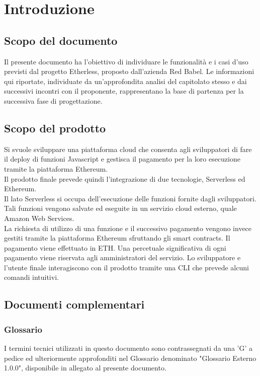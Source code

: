 \section{Introduzione}
\subsection{Scopo del documento}
	Il presente documento ha l'obiettivo di individuare le funzionalità e i casi d'uso previsti dal progetto Etherless, proposto dall'azienda Red Babel. Le informazioni qui riportate, individuate da un'approfondita analisi del capitolato stesso e dai successivi incontri con il proponente, rappresentano la base di partenza per la successiva fase di progettazione.

\subsection{Scopo del prodotto}
	Si svuole sviluppare una piattaforma cloud che consenta agli sviluppatori di fare il deploy di funzioni Javascript e gestisca il pagamento per la loro esecuzione tramite la piattaforma Ethereum.\\
	Il prodotto finale prevede quindi l'integrazione di due tecnologie, Serverless ed Ethereum.\\
	Il lato Serverless si occupa dell'esecuzione delle funzioni fornite dagli sviluppatori. Tali funzioni vengono salvate ed eseguite in un servizio cloud esterno, quale Amazon Web Services.  \\La richiesta di utilizzo di una funzione e il successivo pagamento vengono invece gestiti tramite la piattaforma Ethereum sfruttando gli smart contracts. Il pagamento viene effettuato in ETH. Una percetuale significativa di ogni pagamento viene riservata agli amministratori del servizio. 
	Lo sviluppatore e l'utente finale interagiscono con il prodotto tramite una CLI che prevede alcuni comandi intuitivi.

\subsection{Documenti complementari}
\subsubsection{Glossario}
	I termini tecnici utilizzati in questo documento sono contrassegnati da una ’G’ a pedice ed ulteriormente approfonditi nel Glossario denominato "Glossario Esterno 1.0.0", disponibile in allegato al presente documento.

